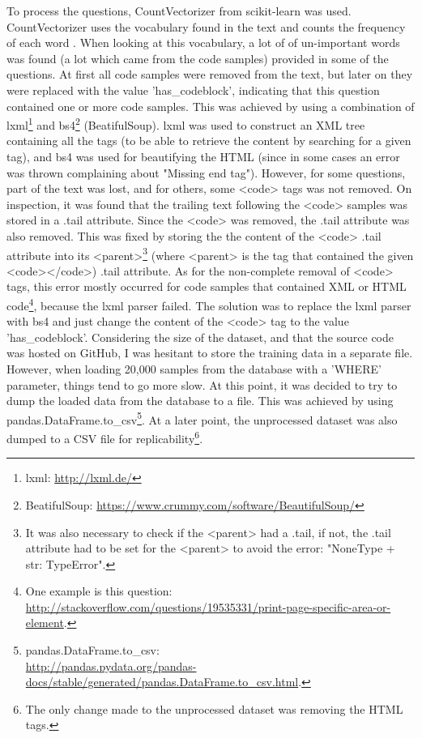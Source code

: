 \noindent
To process the questions, CountVectorizer from scikit-learn was used. CountVectorizer uses the vocabulary found 
in the text and counts the frequency of each word \cite{Scikitlearn.org2016b} \cite[4.2.3]{Scikitlearn.org2016}. 
When looking at this vocabulary, a lot of of un-important words was found (a lot which came from the code 
samples) provided in some of the questions. At first all code samples were removed from the text, but later on 
they were replaced with the value 'has\_codeblock', indicating that this question contained one or more code 
 samples. This was achieved by using a combination of lxml\footnote{lxml: \url{http://lxml.de/}} and 
bs4\footnote{BeatifulSoup: \url{https://www.crummy.com/software/BeautifulSoup/}} (BeatifulSoup). lxml was used 
to construct an XML tree containing all the tags (to be able to retrieve the content by searching for a given 
tag), and bs4 was used for beautifying the HTML (since in some cases an error was thrown complaining about 
"Missing end tag").
\vspace{0.5em}\newline
However, for some questions, part of the text was lost, and for others, some <code> tags was not removed. 
On inspection, it was found that the trailing text following the <code> samples was stored in a .tail attribute. 
Since the <code> was removed, the .tail attribute was also removed. This was fixed by storing the the content 
of the <code> .tail attribute into its <parent>\footnote{It was also necessary to check if the 
	<parent> had a .tail, if not, the .tail attribute had to be set for the <parent> to avoid the error: 
	"NoneType + str: TypeError".} (where <parent> is the tag that contained the given <code></code>) .tail 
attribute. As for the non-complete removal of <code> tags, this error mostly occurred for code samples that 
contained XML or HTML code\footnote{One example is this question: \\
	\url{http://stackoverflow.com/questions/19535331/print-page-specific-area-or-element}.}, because the lxml 
parser failed. The solution was to replace the lxml parser with bs4 and just change the content of the <code> 
tag to the value 'has\_codeblock'.
\vspace{0.5em}\newline
Considering the size of the dataset, and that the source code was hosted on GitHub, I was hesitant to store 
the training data in a separate file. However, when loading 20,000 samples from the database with a 'WHERE' 
parameter, things tend to go more slow. At this point, it was decided to try to dump the loaded data from the 
database to a file. This was achieved by using pandas.DataFrame.to\_csv\footnote{pandas.DataFrame.to\_csv: \\
	\url{http://pandas.pydata.org/pandas-docs/stable/generated/pandas.DataFrame.to_csv.html}.}. At a later point, 
the unprocessed dataset was also dumped to a CSV file for replicability\footnote{The only change made to the 
	unprocessed dataset was removing the HTML tags.}.
\vspace{0.5em}\newline



